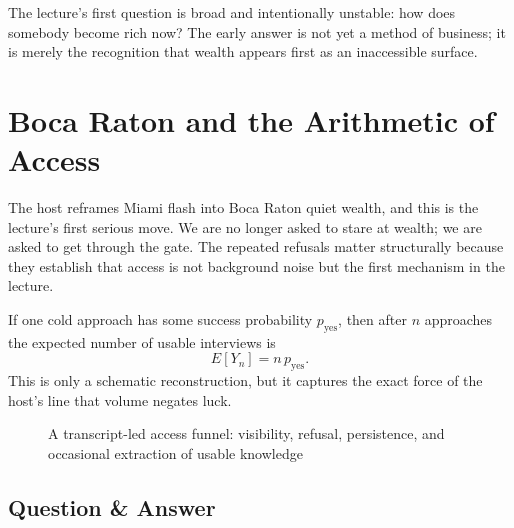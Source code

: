 The lecture's first question is broad and intentionally unstable: how does somebody become rich now? The early answer is not yet a method of business; it is merely the recognition that wealth appears first as an inaccessible surface.

\section{Boca Raton and the Arithmetic of Access}

The host reframes Miami flash into Boca Raton quiet wealth, and this is the lecture's first serious move. We are no longer asked to stare at wealth; we are asked to get through the gate. The repeated refusals matter structurally because they establish that access is not background noise but the first mechanism in the lecture.

If one cold approach has some success probability \(p_{\mathrm{yes}}\), then after \(n\) approaches the expected number of usable interviews is
\begin{equation}
E[Y_n]=n\,p_{\mathrm{yes}}.
\end{equation}
This is only a schematic reconstruction, but it captures the exact force of the host's line that volume negates luck.

\begin{figure}[h]
\centering
{}
\caption{A transcript-led access funnel: visibility, refusal, persistence, and occasional extraction of usable knowledge}
\end{figure}

\subsection{Question \& Answer}

